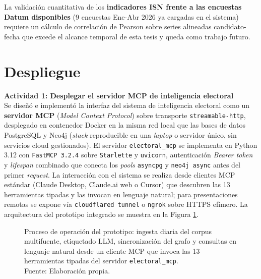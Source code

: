 La validación cuantitativa de los \textbf{indicadores ISN frente a las
encuestas Datum disponibles} (9 encuestas Ene-Abr 2026 ya cargadas en el
sistema) requiere un cálculo de correlación de Pearson sobre series alineadas
candidato-fecha que excede el alcance temporal de esta tesis y queda como
trabajo futuro.

\section{Despliegue}

\textbf{Actividad 1: Desplegar el servidor MCP de inteligencia electoral}
\\
Se diseñó e implementó la interfaz del sistema de inteligencia electoral como un
\textbf{servidor MCP} (\textit{Model Context Protocol}) sobre transporte
\texttt{streamable-http}, desplegado en contenedor Docker en la misma red local
que las bases de datos PostgreSQL y Neo4j (\textit{stack} reproducible en una
\textit{laptop} o servidor único, sin servicios cloud gestionados). El servidor
\texttt{electoral\_mcp} se implementa en Python 3.12 con \texttt{FastMCP 3.2.4}
sobre \texttt{Starlette} y \texttt{uvicorn}, autenticación \textit{Bearer token}
y \textit{lifespan} combinado que conecta los \textit{pools} \texttt{asyncpg} y
\texttt{neo4j async} antes del primer \textit{request}. La interacción con el
sistema se realiza desde clientes MCP estándar (Claude Desktop, Claude.ai web o
Cursor) que descubren las 13 herramientas tipadas y las invocan en lenguaje
natural; para presentaciones remotas se expone vía \texttt{cloudflared tunnel} o
\texttt{ngrok} sobre HTTPS efímero. La arquitectura del prototipo integrado se
muestra en la Figura \ref{5:fig24}.

\begin{figure}[!ht]
    \begin{center}
        \resizebox{0.85\textwidth}{!}{}
        \caption[Proceso de operación del prototipo del sistema de inteligencia electoral]{Proceso de operación del prototipo: ingesta diaria del corpus multifuente, etiquetado LLM, sincronización del grafo y consultas en lenguaje natural desde un cliente MCP que invoca las 13 herramientas tipadas del servidor \texttt{electoral\_mcp}.\\
            Fuente: Elaboración propia.}
        \label{5:fig24}
    \end{center}
\end{figure}

